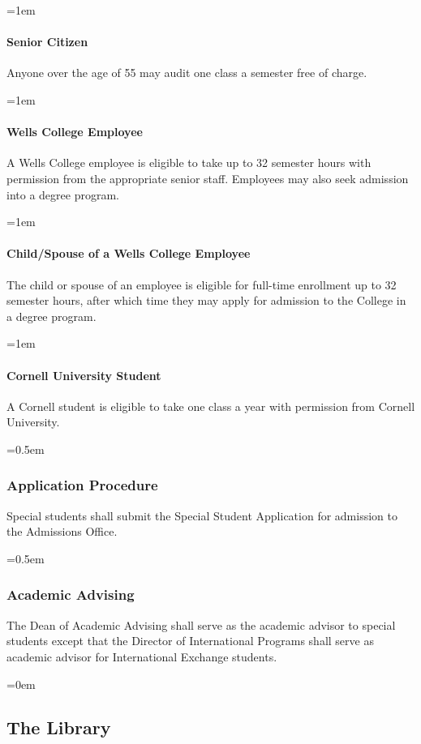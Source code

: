 \documentclass{manual}
\let\oldsubsection\subsection
\renewcommand\subsection{\leftskip=0em\oldsubsection}
\let\oldsubsubsection\subsubsection
\renewcommand\subsubsection{\leftskip=0.5em\oldsubsubsection}
\let\oldparagraph\paragraph
\renewcommand\paragraph{\leftskip=1em\oldparagraph}
\begin{document}
\paragraph{Senior Citizen} Anyone over the age of 55 may audit one class a semester free of charge.

\paragraph{Wells College Employee}\label{par:employeeClasses} A Wells College employee is eligible to take up to 32 semester hours with permission from the appropriate senior staff. Employees may also seek admission into a degree program.

\paragraph{Child/Spouse of a Wells College Employee}\label{par:spouseClasses} The child or spouse of an employee is eligible for full-time enrollment up to 32 semester hours, after which time they may apply for admission to the College in a degree program.

\paragraph{Cornell University Student} A Cornell student is eligible to take one class a year with permission from Cornell University.

\subsubsection{Application Procedure}

Special students shall submit the Special Student Application for admission to the Admissions Office.

\subsubsection{Academic Advising}

The Dean of Academic Advising shall serve as the academic advisor to special students except that the Director of International Programs shall serve as academic advisor for International Exchange students. 

\subsection{The Library}
\end{document}
